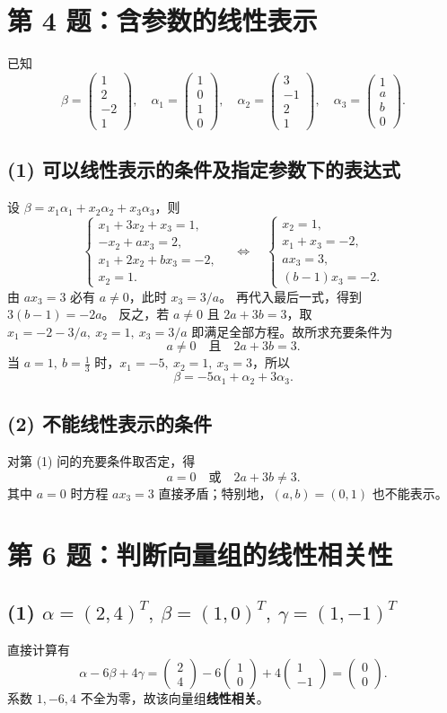 \documentclass[11pt,a4paper,fontset=fandol]{ctexart}
\newcommand{\ans}[1]{\boxed{#1}}
\newcommand{\problem}[1]{\Needspace{7\baselineskip}\section*{#1}}
\newcommand{\parttitle}[1]{\Needspace{4\baselineskip}\subsection*{#1}}
\begin{document}
\problem{第 4 题：含参数的线性表示}
已知
\[
\beta=\begin{pmatrix}1\\2\\-2\\1\end{pmatrix},\quad
\alpha_1=\begin{pmatrix}1\\0\\1\\0\end{pmatrix},\quad
\alpha_2=\begin{pmatrix}3\\-1\\2\\1\end{pmatrix},\quad
\alpha_3=\begin{pmatrix}1\\a\\b\\0\end{pmatrix}.
\]
\parttitle{(1) 可以线性表示的条件及指定参数下的表达式}
设 $\beta=x_1\alpha_1+x_2\alpha_2+x_3\alpha_3$，则
\[
\begin{cases}
x_1+3x_2+x_3=1,\\
-x_2+ax_3=2,\\
x_1+2x_2+bx_3=-2,\\
x_2=1.
\end{cases}
\quad\Longleftrightarrow\quad
\begin{cases}
x_2=1,\\
x_1+x_3=-2,\\
ax_3=3,\\
(b-1)x_3=-2.
\end{cases}
\]
由 $ax_3=3$ 必有 $a\ne0$，此时 $x_3=3/a$。
再代入最后一式，得到 $3(b-1)=-2a$。
反之，若 $a\ne0$ 且 $2a+3b=3$，取
$x_1=-2-3/a,\ x_2=1,\ x_3=3/a$ 即满足全部方程。故所求充要条件为
\[
\ans{a\ne0\quad\text{且}\quad 2a+3b=3}.
\]
当 $a=1,\ b=\frac13$ 时，$x_1=-5,\ x_2=1,\ x_3=3$，所以
\[
\ans{\beta=-5\alpha_1+\alpha_2+3\alpha_3}.
\]
\parttitle{(2) 不能线性表示的条件}
对第 (1) 问的充要条件取否定，得
\[
\ans{a=0\quad\text{或}\quad 2a+3b\ne3}.
\]
其中 $a=0$ 时方程 $ax_3=3$ 直接矛盾；特别地，$(a,b)=(0,1)$ 也不能表示。

\newpage
\problem{第 6 题：判断向量组的线性相关性}
\parttitle{(1) $\alpha=(2,4)^T,\ \beta=(1,0)^T,\ \gamma=(1,-1)^T$}
直接计算有
\[
\alpha-6\beta+4\gamma
=\begin{pmatrix}2\\4\end{pmatrix}
-6\begin{pmatrix}1\\0\end{pmatrix}
+4\begin{pmatrix}1\\-1\end{pmatrix}
=\begin{pmatrix}0\\0\end{pmatrix}.
\]
系数 $1,-6,4$ 不全为零，故该向量组\textbf{线性相关}。
\end{document}
